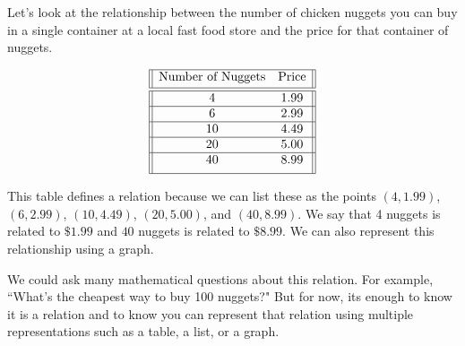\documentclass{ximera}
\begin{document}
\begin{example}
Let's look at the relationship between the number of chicken nuggets
you can buy in a single container at a local fast food store and the
price for that container of nuggets.

$$
 \begin{array}{||c c||} 
 \hline
 \text{Number of Nuggets} & \text{Price} \\[0.5ex] 
 \hline\hline
 4 & 1.99\\ 
 \hline
 6 & 2.99 \\
 \hline
 10 & 4.49\\
 \hline
 20 & 5.00 \\
 \hline
 40 & 8.99\\[1ex] 
 \hline
\end{array}
$$
\begin{explanation}
This table defines a relation because we can list these as the points $(4,1.99)$, $(6,2.99)$, $(10,4.49)$, $(20,5.00)$, and $(40, 8.99)$.  We say that 4 nuggets is related to $\$1.99$ and $40$ nuggets is related to $\$8.99$.  We can also represent this relationship using a graph.
\begin{image}
\end{image}
We could ask many mathematical questions about this relation.  For example, ``What's the cheapest way to buy 100 nuggets?"  But for now, its enough to know it is a relation and to know you can represent that relation using multiple representations such as a table, a list, or a graph.
  \end{explanation}
\end{example}
\end{document}
